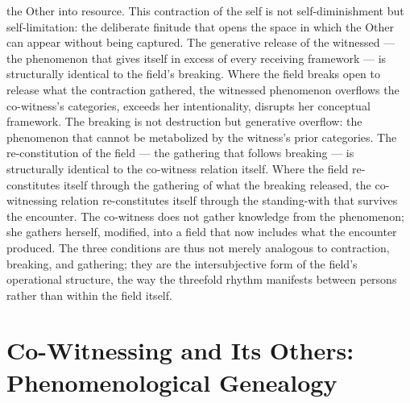 the Other into resource. This contraction of the self is not self-diminishment but self-limitation: the deliberate finitude that opens the space in which the Other can appear without being captured. The generative release of the witnessed — the phenomenon that gives itself in excess of every receiving framework — is structurally identical to the field’s breaking. Where the field breaks open to release what the contraction gathered, the witnessed phenomenon overflows the co-witness’s categories, exceeds her intentionality, disrupts her conceptual framework. The breaking is not destruction but generative overflow: the phenomenon that cannot be metabolized by the witness’s prior categories. The re-constitution of the field — the gathering that follows breaking — is structurally identical to the co-witness relation itself. Where the field re-constitutes itself through the gathering of what the breaking released, the co-witnessing relation re-constitutes itself through the standing-with that survives the encounter. The co-witness does not gather knowledge from the phenomenon; she gathers herself, modified, into a field that now includes what the encounter produced. The three conditions are thus not merely analogous to contraction, breaking, and gathering; they are the intersubjective form of the field’s operational structure, the way the threefold rhythm manifests between persons rather than within the field itself.

\section{Co-Witnessing and Its Others: Phenomenological Genealogy}

